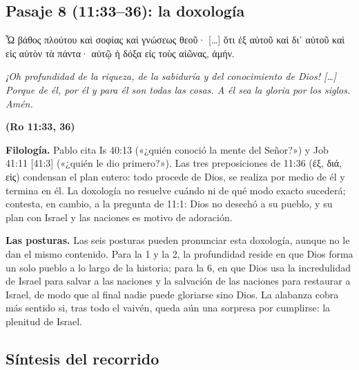 \documentclass[11pt,letterpaper]{article}
\newcommand{\grc}[1]{\foreignlanguage{ancientgreek}{#1}}
\newcommand{\fuente}[1]{\par\hfill{\upshape\bfseries\small\textcolor{ladrillo}{#1}}}
\begin{document}
\subsection{Pasaje 8 (11:33--36): la doxología}

\begin{cita}[fontupper=\upshape]
\grc{Ὦ βάθος πλούτου καὶ σοφίας καὶ γνώσεως θεοῦ· [\ldots] ὅτι ἐξ αὐτοῦ καὶ δι᾿ αὐτοῦ καὶ εἰς αὐτὸν τὰ πάντα· αὐτῷ ἡ δόξα εἰς τοὺς αἰῶνας, ἀμήν.}\par\smallskip
\itshape ¡Oh profundidad de la riqueza, de la sabiduría y del conocimiento de Dios! [\ldots] Porque de él, por él y para él son todas las cosas. A él sea la gloria por los siglos. Amén.\fuente{(Ro 11:33, 36)}
\end{cita}

\textbf{Filología.} Pablo cita Is 40:13 («¿quién conoció la mente del Señor?») y Job 41:11 [41:3] («¿quién le dio primero?»). Las tres preposiciones de 11:36 (\grc{ἐξ}, \grc{διά}, \grc{εἰς}) condensan el plan entero: todo procede de Dios, se realiza por medio de él y termina en él. La doxología no resuelve cuándo ni de qué modo exacto sucederá; contesta, en cambio, a la pregunta de 11:1: Dios no desechó a su pueblo, y su plan con Israel y las naciones es motivo de adoración.

\textbf{Las posturas.} Las seis posturas pueden pronunciar esta doxología, aunque no le dan el mismo contenido. Para la 1 y la 2, la profundidad reside en que Dios forma un solo pueblo a lo largo de la historia; para la 6, en que Dios usa la incredulidad de Israel para salvar a las naciones y la salvación de las naciones para restaurar a Israel, de modo que al final nadie puede gloriarse sino Dios. La alabanza cobra más sentido si, tras todo el vaivén, queda aún una sorpresa por cumplirse: la plenitud de Israel.

\subsection{Síntesis del recorrido}
\end{document}
